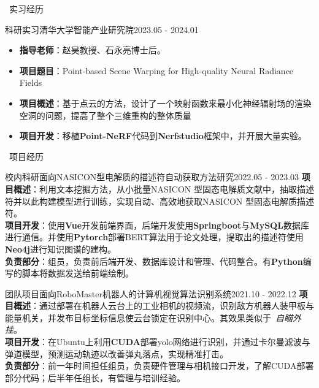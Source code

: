 \documentclass[UTF8]{resume}
\begin{document}
\begin{rSection}{\faBriefcase~实习经历}
    \begin{rExperience}{科研实习}{清华大学智能产业研究院}{2023.05 - 2024.01}
        \begin{itemize}
            \itemsep -0.5em \vspace{-0.5em}
            \item \textbf{指导老师}：赵昊教授、石永亮博士后。
            \item \textbf{项目题目}：Point-based Scene Warping for High-quality Neural Radiance Fields
            \item \textbf{项目概述}：基于点云的方法，设计了一个映射函数来最小化神经辐射场的渲染空洞的问题，提高了整个三维重构的整体质量
            \item \textbf{项目开发}：移植\textbf{Point-NeRF}代码到\textbf{Nerfstudio}框架中，并开展大量实验。
        \end{itemize}
    \end{rExperience}
\end{rSection}

\begin{rSection}{\faUsers~项目经历}
    \begin{rProject}{校内科研}{面向NASICON型电解质的描述符自动获取方法研究}{2022.05 - 2023.03}
        \textbf{项目概述}：利用文本挖掘方法，从小批量NASICON 型固态电解质文献中，抽取描述符并以此构建模型进行训练，实现自动、高效地获取NASICON 型固态电解质描述符。\\
        \textbf{项目开发}：使用\textbf{Vue}开发前端界面，后端开发使用\textbf{Springboot}与\textbf{MySQL}数据库进行通信。并使用\textbf{Pytorch}部署BERT算法用于论文处理，提取出的描述符使用\textbf{Neo4j}进行知识图谱的建构。\\
        \textbf{负责部分}：组员，负责前后端开发、数据库设计和管理、代码整合。有\textbf{Python}编写的脚本将数据发送给前端绘制。
    \end{rProject}

    \begin{rProject}{团队项目}{面向RoboMaster机器人的计算机视觉算法识别系统}{2021.10 - 2022.12}
        \textbf{项目概述}：通过部署在机器人云台上的工业相机的视频流，识别敌方机器人装甲板与能量机关，并发布目标坐标信息使云台锁定在识别中心。其效果类似于~\textit{自瞄外挂}。\\
        \textbf{项目开发}：在Ubuntu上利用\textbf{CUDA}部署yolo网络进行识别，并通过卡尔曼滤波与弹道模型，预测运动轨迹以改善弹丸落点，实现精准打击。\\
        \textbf{负责部分}：前一年时间担任组员，负责硬件管理与相机接口开发，了解CUDA部署部分代码；后半年任组长，有管理与培训经验。
    \end{rProject}
\end{rSection}
\end{document}
